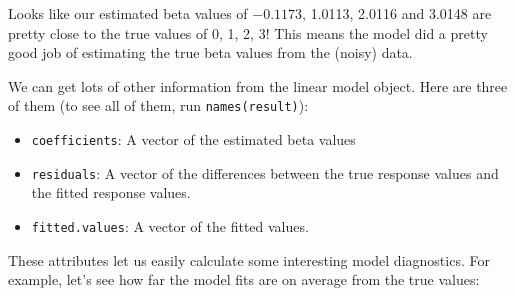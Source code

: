 \documentclass{tufte-book}\usepackage[]{graphicx}\usepackage[]{color}
\makeatletter
\newcommand{\hlnum}[1]{\textcolor[rgb]{0.686,0.059,0.569}{#1}}%
\newcommand{\hlcom}[1]{\textcolor[rgb]{0.678,0.584,0.686}{\textit{#1}}}%
\newcommand{\hlopt}[1]{\textcolor[rgb]{0,0,0}{#1}}%
\newcommand{\hlstd}[1]{\textcolor[rgb]{0.345,0.345,0.345}{#1}}%
\newcommand{\hlkwb}[1]{\textcolor[rgb]{0.69,0.353,0.396}{#1}}%
\newcommand{\hlkwc}[1]{\textcolor[rgb]{0.333,0.667,0.333}{#1}}%
\newcommand{\hlkwd}[1]{\textcolor[rgb]{0.737,0.353,0.396}{\textbf{#1}}}%
\newenvironment{kframe}{%
 \def\at@end@of@kframe{}%
 \ifinner\ifhmode%
  \def\at@end@of@kframe{\end{minipage}}%
  \begin{minipage}{\columnwidth}%
 \fi\fi%
 \def\FrameCommand##1{\hskip\@totalleftmargin \hskip-\fboxsep
 \colorbox{shadecolor}{##1}\hskip-\fboxsep
     \hskip-\linewidth \hskip-\@totalleftmargin \hskip\columnwidth}%
 \MakeFramed {\advance\hsize-\width
   \@totalleftmargin\z@ \linewidth\hsize
   \@setminipage}}%
 {\par\unskip\endMakeFramed%
 \at@end@of@kframe}
\newenvironment{knitrout}{}{} %
\makeatother
\begin{document}
\begin{footnotesize}

Looks like our estimated beta values of \ensuremath{-0.1173}, 1.0113, 2.0116 and 3.0148 are pretty close to the true values of 0, 1, 2, 3! This means the model did a pretty good job of estimating the true beta values from the (noisy) data. 

We can get lots of other information from the linear model object. Here are three of them (to see all of them, run \texttt{names(result)}):

\begin{itemize}
  \item \texttt{coefficients}: A vector of the estimated beta values
  \item \texttt{residuals}: A vector of the differences between the true response values and the fitted response values.
  \item \texttt{fitted.values}: A vector of the fitted values.
\end{itemize}

These attributes let us easily calculate some interesting model diagnostics. For example, let's see how far the model fits are on average from the true values:


\end{footnotesize}
\end{document}
